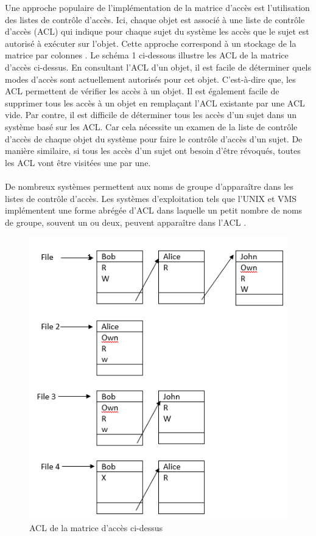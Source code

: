 Une approche populaire de l'implémentation de la matrice d'accès est l'utilisation des listes de contrôle d'accès. Ici, chaque objet est associé à une liste de contrôle d'accès (ACL) qui indique pour chaque sujet du système les accès que le sujet est autorisé à exécuter sur l'objet. Cette approche correspond à un stockage de la matrice par colonnes \cite{sandhu94}. Le schéma 1 ci-dessous illustre les ACL de la matrice d'accès ci-dessus. En consultant l'ACL d'un objet, il est facile de déterminer quels modes d'accès sont actuellement autorisés pour cet objet. C'est-à-dire que, les ACL permettent de vérifier les accès à un objet. Il est également facile de supprimer tous les accès à un objet en remplaçant l'ACL existante par une ACL vide. Par contre, il est difficile de déterminer tous les accès d'un sujet dans un système basé sur les ACL. Car cela nécessite un examen de la liste de contrôle d'accès de chaque objet du système pour faire le contrôle d'accès d'un sujet. De manière similaire, si tous les accès d'un sujet ont besoin d'être révoqués, toutes les ACL vont être visitées une par une. 
\paragraph{} De nombreux systèmes permettent aux noms de groupe d'apparaître dans les listes de contrôle d'accès. Les systèmes d'exploitation tels que l'UNIX et VMS implémentent une forme abrégée d'ACL dans laquelle un petit nombre de noms de groupe, souvent un ou deux, peuvent apparaître dans l'ACL \cite{sandhu94}.

\begin{figure}[h!]
    \centering
		\includegraphics[scale=0.7]{chap2/images/acl.png}
    \caption{ACL de la matrice d'accès ci-dessus}
	 \label{figAcl}
\end{figure}

